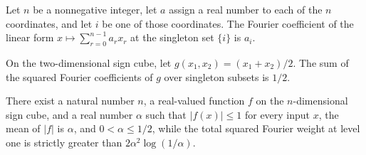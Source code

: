 \begin{theorem}
\label{FABL.fourierCoeff_linearForm_singleton}
\leanok
{}
Let $n$ be a nonnegative integer, let $a$ assign a real number to each of the $n$
coordinates, and let $i$ be one of those coordinates. The Fourier coefficient of the
linear form $x\mapsto\sum_{r=0}^{n-1}a_r x_r$ at the singleton set $\{i\}$ is $a_i$.
\end{theorem}

\begin{theorem}
\label{FABL.fourierWeightAtLevel_one_sharpLevelOneSignedCounterexample}
\leanok
{}
On the two-dimensional sign cube, let $g(x_1,x_2)=(x_1+x_2)/2$. The sum of the squared
Fourier coefficients of $g$ over singleton subsets is $1/2$.
\end{theorem}

\begin{theorem}
\label{FABL.not_sharpLevelOneInequality_signed}
\leanok
{}
There exist a natural number $n$, a real-valued function $f$ on the $n$-dimensional sign
cube, and a real number $\alpha$ such that $|f(x)|\le 1$ for every input $x$, the mean
of $|f|$ is $\alpha$, and $0<\alpha\le 1/2$, while the total squared Fourier weight at
level one is strictly greater than $2\alpha^2\log(1/\alpha)$.
\end{theorem}
